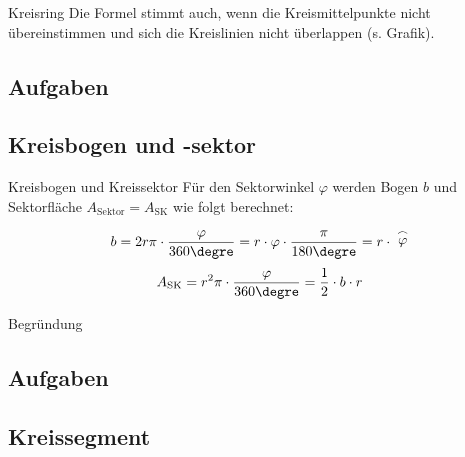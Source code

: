 \begin{bemerkung}{Kreisring}{}
  Die Formel stimmt auch, wenn die Kreismittelpunkte nicht
  übereinstimmen und sich die Kreislinien nicht überlappen (s. Grafik).
  \end{bemerkung}

\subsection*{Aufgaben}


\newpage


\subsection{Kreisbogen und -sektor}
\begin{gesetz}{Kreisbogen und
    Kreissektor}{}
  Für den Sektorwinkel $\varphi$ werden Bogen $b$ und Sektorfläche
  $A_{\text{Sektor}}=A_{\text{SK}}$ wie folgt berechnet:
  
  $$b = 2r\pi \cdot{}\frac{\varphi}{360\degre} = r\cdot{} \varphi
  \cdot{} \frac{\pi}{180\degre}= r\cdot{} \stackrel{\frown}{\varphi}$$
  $$A_{\text{SK}} = r^2\pi\cdot{}\frac{\varphi}{360\degre} = \frac12\cdot{}b\cdot{}r$$
\end{gesetz}


Begründung 

\subsection*{Aufgaben}


\newpage



\subsection{Kreissegment}


